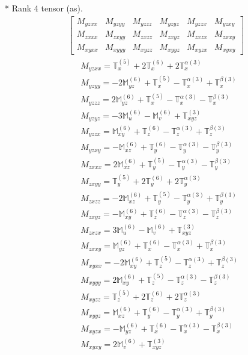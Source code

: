 \documentclass[fleqn,8pt,landscape]{jsarticle}
\begin{document}
* Rank 4 tensor (as).
\begin{align*}
\begin{bmatrix} M_{yzxx} & M_{yzyy} & M_{yzzz} & M_{yzyz} & M_{yzzx} & M_{yzxy} \\ M_{zxxx} & M_{zxyy} & M_{zxzz} & M_{zxyz} & M_{zxzx} & M_{zxxy} \\ M_{xyxx} & M_{xyyy} & M_{xyzz} & M_{xyyz} & M_{xyzx} & M_{xyxy} \end{bmatrix}
\end{align*}
\begin{align*}
& M_{yzxx} = \mathbb{T}_{x}^{(5)} + 2 \mathbb{T}_{x}^{(6)} + 2 \mathbb{T}_{x}^{\alpha(3)} \\
& M_{yzyy} = - 2 \mathbb{M}_{yz}^{(6)} + \mathbb{T}_{x}^{(5)} - \mathbb{T}_{x}^{\alpha(3)} + \mathbb{T}_{x}^{\beta(3)} \\
& M_{yzzz} = 2 \mathbb{M}_{yz}^{(6)} + \mathbb{T}_{x}^{(5)} - \mathbb{T}_{x}^{\alpha(3)} - \mathbb{T}_{x}^{\beta(3)} \\
& M_{yzyz} = - 3 \mathbb{M}_{u}^{(6)} - \mathbb{M}_{v}^{(6)} + \mathbb{T}_{xyz}^{(3)} \\
& M_{yzzx} = \mathbb{M}_{xy}^{(6)} + \mathbb{T}_{z}^{(6)} - \mathbb{T}_{z}^{\alpha(3)} + \mathbb{T}_{z}^{\beta(3)} \\
& M_{yzxy} = - \mathbb{M}_{xz}^{(6)} + \mathbb{T}_{y}^{(6)} - \mathbb{T}_{y}^{\alpha(3)} - \mathbb{T}_{y}^{\beta(3)} \\
& M_{zxxx} = 2 \mathbb{M}_{xz}^{(6)} + \mathbb{T}_{y}^{(5)} - \mathbb{T}_{y}^{\alpha(3)} - \mathbb{T}_{y}^{\beta(3)} \\
& M_{zxyy} = \mathbb{T}_{y}^{(5)} + 2 \mathbb{T}_{y}^{(6)} + 2 \mathbb{T}_{y}^{\alpha(3)} \\
& M_{zxzz} = - 2 \mathbb{M}_{xz}^{(6)} + \mathbb{T}_{y}^{(5)} - \mathbb{T}_{y}^{\alpha(3)} + \mathbb{T}_{y}^{\beta(3)} \\
& M_{zxyz} = - \mathbb{M}_{xy}^{(6)} + \mathbb{T}_{z}^{(6)} - \mathbb{T}_{z}^{\alpha(3)} - \mathbb{T}_{z}^{\beta(3)} \\
& M_{zxzx} = 3 \mathbb{M}_{u}^{(6)} - \mathbb{M}_{v}^{(6)} + \mathbb{T}_{xyz}^{(3)} \\
& M_{zxxy} = \mathbb{M}_{yz}^{(6)} + \mathbb{T}_{x}^{(6)} - \mathbb{T}_{x}^{\alpha(3)} + \mathbb{T}_{x}^{\beta(3)} \\
& M_{xyxx} = - 2 \mathbb{M}_{xy}^{(6)} + \mathbb{T}_{z}^{(5)} - \mathbb{T}_{z}^{\alpha(3)} + \mathbb{T}_{z}^{\beta(3)} \\
& M_{xyyy} = 2 \mathbb{M}_{xy}^{(6)} + \mathbb{T}_{z}^{(5)} - \mathbb{T}_{z}^{\alpha(3)} - \mathbb{T}_{z}^{\beta(3)} \\
& M_{xyzz} = \mathbb{T}_{z}^{(5)} + 2 \mathbb{T}_{z}^{(6)} + 2 \mathbb{T}_{z}^{\alpha(3)} \\
& M_{xyyz} = \mathbb{M}_{xz}^{(6)} + \mathbb{T}_{y}^{(6)} - \mathbb{T}_{y}^{\alpha(3)} + \mathbb{T}_{y}^{\beta(3)} \\
& M_{xyzx} = - \mathbb{M}_{yz}^{(6)} + \mathbb{T}_{x}^{(6)} - \mathbb{T}_{x}^{\alpha(3)} - \mathbb{T}_{x}^{\beta(3)} \\
& M_{xyxy} = 2 \mathbb{M}_{v}^{(6)} + \mathbb{T}_{xyz}^{(3)}
\end{align*}
\end{document}
